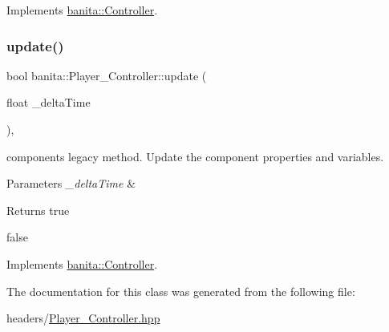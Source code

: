 Implements \mbox{\hyperlink{classbanita_1_1_controller_a74933400a4ed56e68ce5cb11ec395a1b}{banita\+::\+Controller}}.

\mbox{\label{classbanita_1_1_player___controller_ab7c47cba21892cac0e9f8a366cf86ca8}} 
\subsubsection{\texorpdfstring{update()}{update()}}
{\footnotesize\ttfamily bool banita\+::\+Player\+\_\+\+Controller\+::update (\begin{DoxyParamCaption}\item[{float}]{\+\_\+delta\+Time }\end{DoxyParamCaption})\hspace{0.3cm}{\ttfamily [override]}, {\ttfamily [virtual]}}



component\textquotesingle{}s legacy method. Update the component properties and variables. 


\begin{DoxyParams}{Parameters}
{\em \+\_\+delta\+Time} & \\
\hline
\end{DoxyParams}
\begin{DoxyReturn}{Returns}
true 

false 
\end{DoxyReturn}


Implements \mbox{\hyperlink{classbanita_1_1_controller_a44363ca0ed1ba66a9f6c079a6b158d94}{banita\+::\+Controller}}.



The documentation for this class was generated from the following file\+:\begin{DoxyCompactItemize}
\item 
headers/\mbox{\hyperlink{_player___controller_8hpp}{Player\+\_\+\+Controller.\+hpp}}\end{DoxyCompactItemize}
